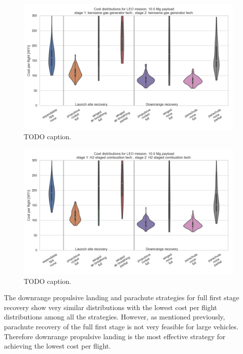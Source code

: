 \documentclass[conf]{new-aiaa}
\begin{document}
\begin{figure}[hbt!]
    \centering
    \includegraphics[width=\textwidth]{../../lvreuse/analysis/combined/plots/strategy_cost_LEO_kerosene_pld10000}
    \caption{\label{fig:strategy_cost_LEO_kerosene_pld10000} TODO caption.}
\end{figure}

\begin{figure}[hbt!]
    \centering
    \includegraphics[width=\textwidth]{../../lvreuse/analysis/combined/plots/strategy_cost_LEO_H2_pld10000}
    \caption{\label{fig:strategy_cost_LEO_H2_pld10000} TODO caption.}
\end{figure}

The downrange propulsive landing and parachute strategies for full first stage recovery show very similar distributions with the lowest cost per flight distributions among all the strategies. However, as mentioned previously, parachute recovery of the full first stage is not very feasible for large vehicles. Therefore downrange propulsive landing is the most effective strategy for achieving the lowest cost per flight. 
\end{document}
